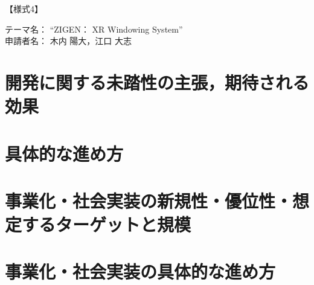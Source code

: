 \documentclass[uplatex]{jsarticle}
\begin{document}
\begin{flushright}
  【様式4】
\end{flushright}
テーマ名： ``ZIGEN： XR Windowing System'' \\
申請者名： 木内 陽大，江口 大志



\section{開発に関する未踏性の主張，期待される効果}


\section{具体的な進め方}


\section{事業化・社会実装の新規性・優位性・想定するターゲットと規模}


\section{事業化・社会実装の具体的な進め方}
\end{document}

